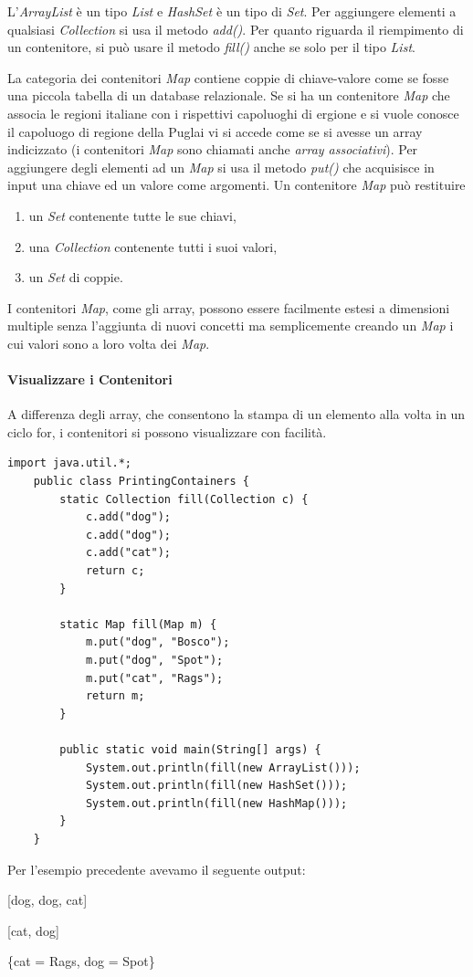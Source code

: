 \documentclass[12pt]{report}
\begin{document}
L'\textit{ArrayList} è un tipo \textit{List} e \textit{HashSet} è un tipo di \textit{Set}. Per aggiungere elementi a qualsiasi \textit{Collection} si usa il metodo \textit{add()}. Per quanto riguarda il riempimento di un contenitore, si può usare il metodo \textit{fill()} anche se solo per il tipo \textit{List}.

	La categoria dei contenitori \textit{Map} contiene coppie di chiave-valore come se fosse una piccola tabella di un database relazionale. Se si ha un contenitore \textit{Map} che associa le regioni italiane con i rispettivi capoluoghi di ergione e si vuole conosce il capoluogo di regione della Puglai vi si accede come se si avesse un array indicizzato (i contenitori \textit{Map} sono chiamati anche \textit{array associativi}). Per aggiungere degli elementi ad un \textit{Map} si usa il metodo \textit{put()} che acquisisce in input una chiave ed un valore come argomenti. Un contenitore \textit{Map} può restituire
	\begin{enumerate}
		\item un \textit{Set} contenente tutte le sue chiavi,
		\item una \textit{Collection} contenente tutti i suoi valori,
		\item un \textit{Set} di coppie.
	\end{enumerate}
	I contenitori \textit{Map}, come gli array, possono essere facilmente estesi a dimensioni multiple senza l'aggiunta di nuovi concetti ma semplicemente creando un \textit{Map} i cui valori sono a loro volta dei \textit{Map}.
	\paragraph{Visualizzare i Contenitori}
	A differenza degli array, che consentono la stampa di un elemento alla volta in un ciclo for, i contenitori si possono visualizzare con facilità.
	\begin{lstlisting}[style=javastyle]
	import java.util.*;
	public class PrintingContainers {
		static Collection fill(Collection c) {
			c.add("dog");
			c.add("dog");
			c.add("cat");
			return c;
		}

		static Map fill(Map m) {
			m.put("dog", "Bosco");
			m.put("dog", "Spot");
			m.put("cat", "Rags");
			return m;
		}

		public static void main(String[] args) {
			System.out.println(fill(new ArrayList()));
			System.out.println(fill(new HashSet()));
			System.out.println(fill(new HashMap()));
		}
	}
	\end{lstlisting}
	Per l'esempio precedente avevamo il seguente output:
	\begin{center}
	[dog, dog, cat]

	[cat, dog]

	\{cat = Rags, dog = Spot\}
	\end{center}
\end{document}
